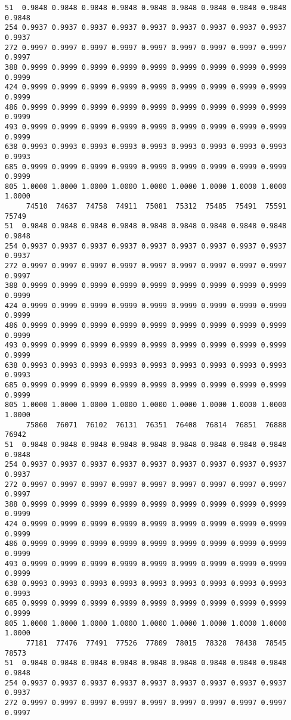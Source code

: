 \documentclass[
]{report}
\begin{document}
\begin{verbatim}
51  0.9848 0.9848 0.9848 0.9848 0.9848 0.9848 0.9848 0.9848 0.9848 0.9848
254 0.9937 0.9937 0.9937 0.9937 0.9937 0.9937 0.9937 0.9937 0.9937 0.9937
272 0.9997 0.9997 0.9997 0.9997 0.9997 0.9997 0.9997 0.9997 0.9997 0.9997
388 0.9999 0.9999 0.9999 0.9999 0.9999 0.9999 0.9999 0.9999 0.9999 0.9999
424 0.9999 0.9999 0.9999 0.9999 0.9999 0.9999 0.9999 0.9999 0.9999 0.9999
486 0.9999 0.9999 0.9999 0.9999 0.9999 0.9999 0.9999 0.9999 0.9999 0.9999
493 0.9999 0.9999 0.9999 0.9999 0.9999 0.9999 0.9999 0.9999 0.9999 0.9999
638 0.9993 0.9993 0.9993 0.9993 0.9993 0.9993 0.9993 0.9993 0.9993 0.9993
685 0.9999 0.9999 0.9999 0.9999 0.9999 0.9999 0.9999 0.9999 0.9999 0.9999
805 1.0000 1.0000 1.0000 1.0000 1.0000 1.0000 1.0000 1.0000 1.0000 1.0000
     74510  74637  74758  74911  75081  75312  75485  75491  75591  75749
51  0.9848 0.9848 0.9848 0.9848 0.9848 0.9848 0.9848 0.9848 0.9848 0.9848
254 0.9937 0.9937 0.9937 0.9937 0.9937 0.9937 0.9937 0.9937 0.9937 0.9937
272 0.9997 0.9997 0.9997 0.9997 0.9997 0.9997 0.9997 0.9997 0.9997 0.9997
388 0.9999 0.9999 0.9999 0.9999 0.9999 0.9999 0.9999 0.9999 0.9999 0.9999
424 0.9999 0.9999 0.9999 0.9999 0.9999 0.9999 0.9999 0.9999 0.9999 0.9999
486 0.9999 0.9999 0.9999 0.9999 0.9999 0.9999 0.9999 0.9999 0.9999 0.9999
493 0.9999 0.9999 0.9999 0.9999 0.9999 0.9999 0.9999 0.9999 0.9999 0.9999
638 0.9993 0.9993 0.9993 0.9993 0.9993 0.9993 0.9993 0.9993 0.9993 0.9993
685 0.9999 0.9999 0.9999 0.9999 0.9999 0.9999 0.9999 0.9999 0.9999 0.9999
805 1.0000 1.0000 1.0000 1.0000 1.0000 1.0000 1.0000 1.0000 1.0000 1.0000
     75860  76071  76102  76131  76351  76408  76814  76851  76888  76942
51  0.9848 0.9848 0.9848 0.9848 0.9848 0.9848 0.9848 0.9848 0.9848 0.9848
254 0.9937 0.9937 0.9937 0.9937 0.9937 0.9937 0.9937 0.9937 0.9937 0.9937
272 0.9997 0.9997 0.9997 0.9997 0.9997 0.9997 0.9997 0.9997 0.9997 0.9997
388 0.9999 0.9999 0.9999 0.9999 0.9999 0.9999 0.9999 0.9999 0.9999 0.9999
424 0.9999 0.9999 0.9999 0.9999 0.9999 0.9999 0.9999 0.9999 0.9999 0.9999
486 0.9999 0.9999 0.9999 0.9999 0.9999 0.9999 0.9999 0.9999 0.9999 0.9999
493 0.9999 0.9999 0.9999 0.9999 0.9999 0.9999 0.9999 0.9999 0.9999 0.9999
638 0.9993 0.9993 0.9993 0.9993 0.9993 0.9993 0.9993 0.9993 0.9993 0.9993
685 0.9999 0.9999 0.9999 0.9999 0.9999 0.9999 0.9999 0.9999 0.9999 0.9999
805 1.0000 1.0000 1.0000 1.0000 1.0000 1.0000 1.0000 1.0000 1.0000 1.0000
     77181  77476  77491  77526  77809  78015  78328  78438  78545  78573
51  0.9848 0.9848 0.9848 0.9848 0.9848 0.9848 0.9848 0.9848 0.9848 0.9848
254 0.9937 0.9937 0.9937 0.9937 0.9937 0.9937 0.9937 0.9937 0.9937 0.9937
272 0.9997 0.9997 0.9997 0.9997 0.9997 0.9997 0.9997 0.9997 0.9997 0.9997

\end{verbatim}
\end{document}
